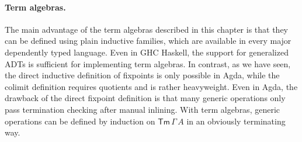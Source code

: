 \documentclass[12pt,a4paper,twoside,openany]{book}
\theoremstyle{remark}
\theoremstyle{definition}
\theoremstyle{theorem}
\newcommand{\Tm}{\mathsf{Tm}}
\begin{document}
\paragraph{Term algebras.}
The main advantage of the term algebras described in this chapter is that they
can be defined using plain inductive families, which are available in every
major dependently typed language. Even in GHC Haskell, the support for
generalized ADTs is sufficient for implementing term algebras. In contrast, as
we have seen, the direct inductive definition of fixpoints is only possible in
Agda, while the colimit definition requires quotients and is rather
heavyweight. Even in Agda, the drawback of the direct fixpoint definition is
that many generic operations only pass termination checking after manual
inlining. With term algebras, generic operations can be defined by induction on
$\Tm\,\Gamma\,A$ in an obviously terminating way.
\end{document}
